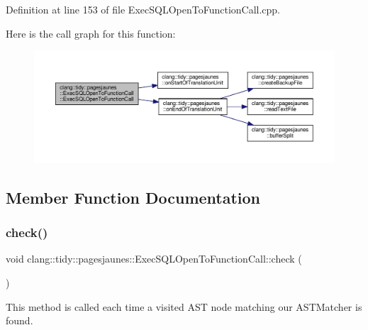 Definition at line 153 of file Exec\+S\+Q\+L\+Open\+To\+Function\+Call.\+cpp.

Here is the call graph for this function\+:
\nopagebreak
\begin{figure}[H]
\begin{center}
\leavevmode
\includegraphics[width=350pt]{classclang_1_1tidy_1_1pagesjaunes_1_1_exec_s_q_l_open_to_function_call_acea024dc1151ac348418c1fb5d4e65b0_cgraph}
\end{center}
\end{figure}


\subsection{Member Function Documentation}
\mbox{\label{classclang_1_1tidy_1_1pagesjaunes_1_1_exec_s_q_l_open_to_function_call_ad459a073a4ef5dfcba189e46f618902d}} 
\subsubsection{\texorpdfstring{check()}{check()}}
{\footnotesize\ttfamily void clang\+::tidy\+::pagesjaunes\+::\+Exec\+S\+Q\+L\+Open\+To\+Function\+Call\+::check (\begin{DoxyParamCaption}\item[{const ast\+\_\+matchers\+::\+Match\+Finder\+::\+Match\+Result \&}]{ }\end{DoxyParamCaption})\hspace{0.3cm}{\ttfamily [override]}}



This method is called each time a visited A\+ST node matching our A\+S\+T\+Matcher is found. 

